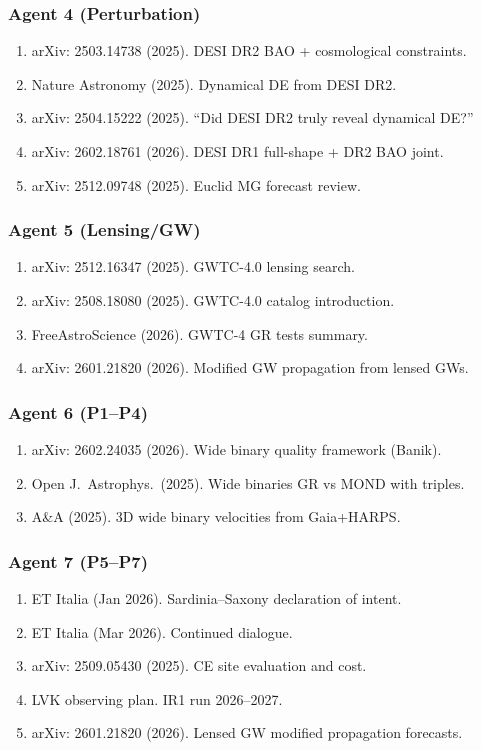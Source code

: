 \documentclass[11pt,a4paper]{article}
\begin{document}
\subsubsection{Agent 4 (Perturbation)}
\begin{enumerate}
\item arXiv: 2503.14738 (2025). DESI DR2 BAO + cosmological constraints.
\item Nature Astronomy (2025). Dynamical DE from DESI DR2.
\item arXiv: 2504.15222 (2025). ``Did DESI DR2 truly reveal dynamical DE?''
\item arXiv: 2602.18761 (2026). DESI DR1 full-shape + DR2 BAO joint.
\item arXiv: 2512.09748 (2025). Euclid MG forecast review.
\end{enumerate}

\subsubsection{Agent 5 (Lensing/GW)}
\begin{enumerate}
\item arXiv: 2512.16347 (2025). GWTC-4.0 lensing search.
\item arXiv: 2508.18080 (2025). GWTC-4.0 catalog introduction.
\item FreeAstroScience (2026). GWTC-4 GR tests summary.
\item arXiv: 2601.21820 (2026). Modified GW propagation from lensed GWs.
\end{enumerate}

\subsubsection{Agent 6 (P1--P4)}
\begin{enumerate}
\item arXiv: 2602.24035 (2026). Wide binary quality framework (Banik).
\item Open J.\ Astrophys.\ (2025). Wide binaries GR vs MOND with triples.
\item A\&A (2025). 3D wide binary velocities from Gaia+HARPS.
\end{enumerate}

\subsubsection{Agent 7 (P5--P7)}
\begin{enumerate}
\item ET Italia (Jan 2026). Sardinia--Saxony declaration of intent.
\item ET Italia (Mar 2026). Continued dialogue.
\item arXiv: 2509.05430 (2025). CE site evaluation and cost.
\item LVK observing plan. IR1 run 2026--2027.
\item arXiv: 2601.21820 (2026). Lensed GW modified propagation forecasts.
\end{enumerate}
\end{document}
